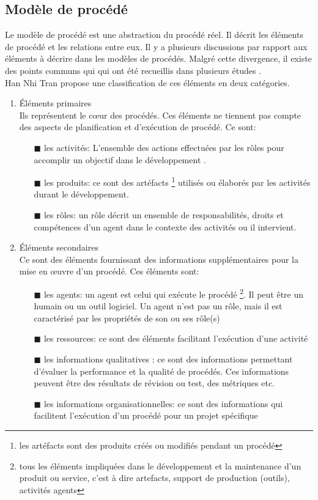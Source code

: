 \subsection{Modèle de procédé}
Le modèle de procédé est une abstraction du procédé réel. Il décrit les éléments de procédé et les relations entre eux. Il y a plusieurs discussions par rapport aux éléments à décrire dans les modèles de procédés. Malgré cette divergence, il existe des points communs qui qui ont été recueillis dans plusieurs études \cite{jl} \cite{abgm} \cite{ac} \cite{fin}.\\
Han Nhi Tran \cite{hnt10} propose une classification de ces éléments en deux catégories.
\begin{enumerate}
\item Éléments primaires\\
Ils représentent le cœur des procédés. Ces éléments ne tiennent pas compte des aspects de planification et d'exécution de procédé. Ce sont:
\begin{itemize}
\item[\tiny{$\blacksquare$}] les activités: L'ensemble des actions effectuées par les rôles pour accomplir un objectif dans le développement \cite{ml11}.
\item[\tiny{$\blacksquare$}] les produits: ce sont des artéfacts \footnote{ les artéfacts sont des produits créés ou modifiés pendant un procédé} utilisés ou élaborés par les activités durant le développement.
\item[\tiny{$\blacksquare$}] les rôles: un rôle décrit un ensemble de responsabilités, droits et compétences d'un agent dans le contexte des activités ou il intervient\cite{ml11}. 
\end{itemize}
\item Éléments secondaires\\
Ce sont des éléments fournissant des informations supplémentaires pour la mise en œuvre d'un procédé. Ces éléments sont: 
\begin{itemize}
\item[\tiny{$\blacksquare$}] les agents: un agent est celui qui exécute le procédé \footnote{ tous les éléments impliquées dans le développement et la maintenance d'un produit ou service, c'est à dire artefacts, support de production (outils), activités agents}. Il peut être un humain ou un outil logiciel. Un agent n'est pas un rôle, mais il est caractérisé par les propriétés de son ou ses rôle(s) \cite{ml11} 
\item[\tiny{$\blacksquare$}] les ressources: ce sont des éléments facilitant l'exécution d'une activité \cite{hnt10}
\item[\tiny{$\blacksquare$}] les informations qualitatives : ce sont des informations permettant d'évaluer la performance et la qualité de procédés. Ces informations peuvent être des résultats de révision ou test, des métriques etc.\cite{hnt10}
\item[\tiny{$\blacksquare$}] les informations organisationnelles: ce sont des informations qui facilitent l'exécution d'un procédé pour un projet spécifique
\end{itemize}
\end{enumerate}
